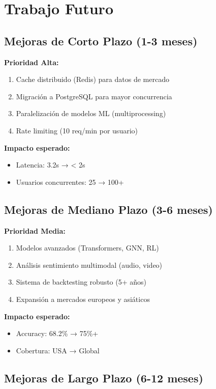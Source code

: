 \documentclass[12pt,a4paper]{article}
\begin{document}
\section{Trabajo Futuro}

\subsection{Mejoras de Corto Plazo (1-3 meses)}

\textbf{Prioridad Alta:}
\begin{enumerate}
    \item Cache distribuido (Redis) para datos de mercado
    \item Migración a PostgreSQL para mayor concurrencia
    \item Paralelización de modelos ML (multiprocessing)
    \item Rate limiting (10 req/min por usuario)
\end{enumerate}

\textbf{Impacto esperado:}
\begin{itemize}
    \item Latencia: 3.2s → < 2s
    \item Usuarios concurrentes: 25 → 100+
\end{itemize}

\subsection{Mejoras de Mediano Plazo (3-6 meses)}

\textbf{Prioridad Media:}
\begin{enumerate}
    \item Modelos avanzados (Transformers, GNN, RL)
    \item Análisis sentimiento multimodal (audio, video)
    \item Sistema de backtesting robusto (5+ años)
    \item Expansión a mercados europeos y asiáticos
\end{enumerate}

\textbf{Impacto esperado:}
\begin{itemize}
    \item Accuracy: 68.2\% → 75\%+
    \item Cobertura: USA → Global
\end{itemize}

\subsection{Mejoras de Largo Plazo (6-12 meses)}
\end{document}

